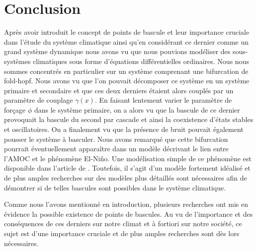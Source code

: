 \section{Conclusion}
Après avoir introduit le concept de points de bascule et leur importance cruciale dans l'étude du système climatique ainsi qu'en considérant ce dernier comme un grand système dynamique nous avons vu que nous pouvions modéliser des sous-systèmes climatiques sous forme d'équations différentielles ordinaires. Nous nous sommes concentrés en particulier sur un système comprenant une bifurcation de fold-hopf. Nous avons vu que l'on pouvait décomposer ce système en un système primaire et secondaire et que ces deux derniers étaient alors couplés par un paramètre de couplage $\gamma(x)$. En faisant lentement varier le paramètre de forçage $\phi$ dans le système primaire, on a alors vu que la bascule de ce dernier provoquait la bascule du second par cascade et ainsi la coexistence d'états stables et oscillatoires. On a finalement vu que la présence de bruit pouvait également pousser le système à basculer. Nous avons remarqué que cette bifurcation pourrait éventuellement apparaître dans un modèle décrivant le lien entre l'AMOC et le phénomène El-Niño. Une modélisation simple de ce phénomène est disponible dans l'article de \cite{dekker_cascading_2018}. Toutefois, il s'agit d'un modèle fortement idéalisé et de plus amples recherches sur des modèles plus détaillés sont nécessaires afin de démontrer si de telles bascules sont possibles dans le système climatique.

Comme nous l'avons mentionné en introduction, plusieurs recherches ont mis en évidence la possible existence de points de bascules. Au vu de l'importance et des conséquences de ces derniers sur notre climat et à fortiori sur notre société, ce sujet est d'une importance cruciale et de plus amples recherches sont dès lors nécessaires.

